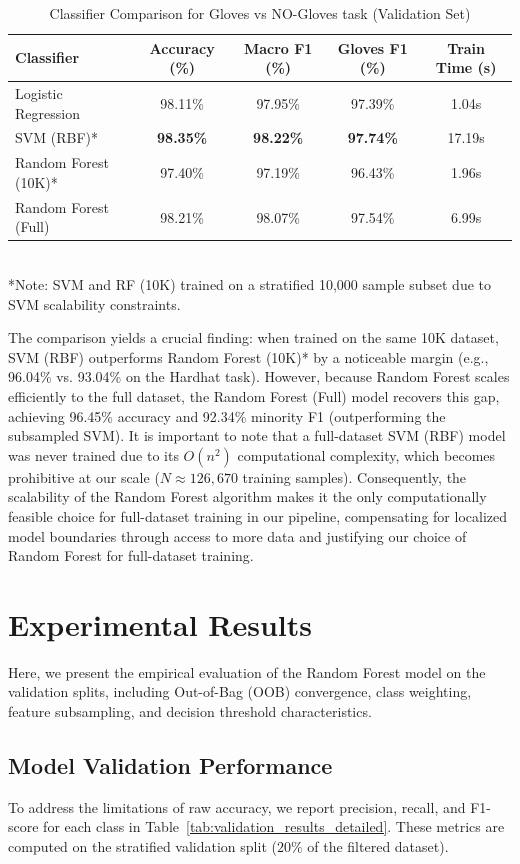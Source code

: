 \documentclass[11pt,a4paper]{article}
\begin{document}
\begin{table}[h]
  \centering
  \caption{Classifier Comparison for Gloves vs NO-Gloves task (Validation Set)}
  \begin{tabular}{lcccc}
    \hline
    Classifier & Accuracy (\%) & Macro F1 (\%) & Gloves F1 (\%) & Train Time (s) \\
    \hline
    Logistic Regression & 98.11\% & 97.95\% & 97.39\% & 1.04s \\
    SVM (RBF)* & \textbf{98.35\%} & \textbf{98.22\%} & \textbf{97.74\%} & 17.19s \\
    Random Forest (10K)* & 97.40\% & 97.19\% & 96.43\% & 1.96s \\
    Random Forest (Full) & 98.21\% & 98.07\% & 97.54\% & 6.99s \\
    \hline
  \end{tabular}
  \\ \vspace{1mm} \small{*Note: SVM and RF (10K) trained on a stratified 10,000 sample subset due to SVM scalability constraints.}
  \label{tab:comp_glovesvsno-gloves}
\end{table}

The comparison yields a crucial finding: when trained on the same 10K dataset, SVM (RBF) outperforms Random Forest (10K)* by a noticeable margin (e.g., 96.04\% vs. 93.04\% on the Hardhat task). However, because Random Forest scales efficiently to the full dataset, the Random Forest (Full) model recovers this gap, achieving 96.45\% accuracy and 92.34\% minority F1 (outperforming the subsampled SVM). It is important to note that a full-dataset SVM (RBF) model was never trained due to its $O(n^2)$ computational complexity, which becomes prohibitive at our scale ($N \approx 126{,}670$ training samples). Consequently, the scalability of the Random Forest algorithm makes it the only computationally feasible choice for full-dataset training in our pipeline, compensating for localized model boundaries through access to more data and justifying our choice of Random Forest for full-dataset training.
\section{Experimental Results}
Here, we present the empirical evaluation of the Random Forest model on the validation splits, including Out-of-Bag (OOB) convergence, class weighting, feature subsampling, and decision threshold characteristics.

\subsection{Model Validation Performance}
\label{sec:validation_eval}
To address the limitations of raw accuracy, we report precision, recall, and F1-score for each class in Table~\ref{tab:validation_results_detailed}. These metrics are computed on the stratified validation split ($20\%$ of the filtered dataset).
\end{document}
